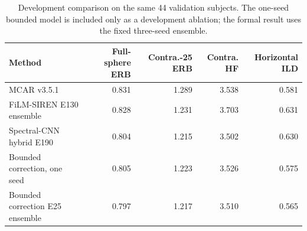 \begin{table}[t]
\centering
\caption{Development comparison on the same 44 validation subjects. The one-seed bounded model is included only as a development ablation; the formal result uses the fixed three-seed ensemble.}
\label{tab:bounded-development}
\begin{tabular}{lrrrr}
\toprule
Method & Full-sphere ERB & Contra.-25 ERB & Contra. HF & Horizontal ILD \\
\midrule
MCAR v3.5.1 & 0.831 & 1.289 & 3.538 & 0.581 \\
FiLM-SIREN E130 ensemble & 0.828 & 1.231 & 3.703 & 0.631 \\
Spectral-CNN hybrid E190 & 0.804 & 1.215 & 3.502 & 0.630 \\
Bounded correction, one seed & 0.805 & 1.223 & 3.526 & 0.575 \\
Bounded correction E25 ensemble & 0.797 & 1.217 & 3.510 & 0.565 \\
\bottomrule
\end{tabular}
\end{table}
